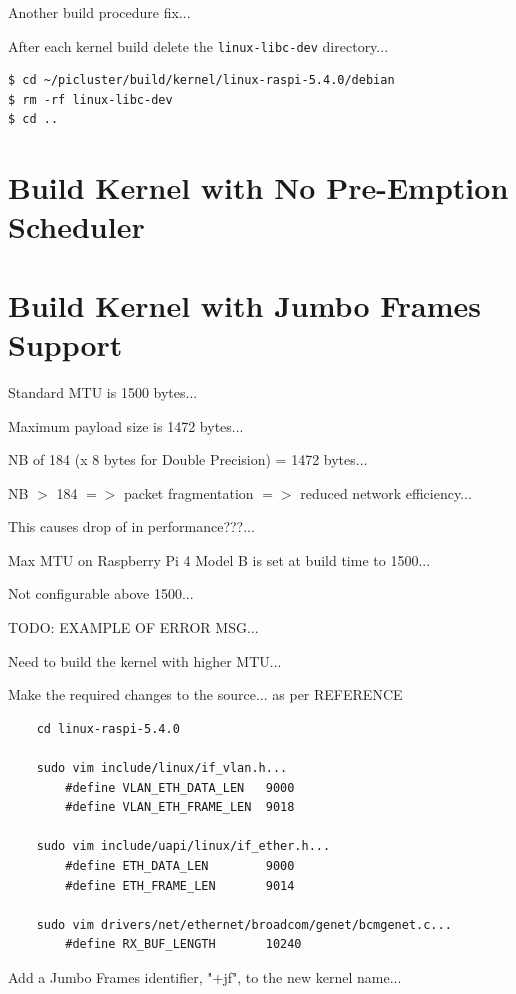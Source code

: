 \documentclass{report}
\begin{document}
Another build procedure fix...

After each kernel build delete the \verb|linux-libc-dev| directory...

\lstset{style=type}
\begin{lstlisting}
$ cd ~/picluster/build/kernel/linux-raspi-5.4.0/debian
$ rm -rf linux-libc-dev
$ cd ..
\end{lstlisting}


%
%
\chapter{Build Kernel with No Pre-Emption Scheduler}


%
%
\chapter{Build Kernel with Jumbo Frames Support}

Standard MTU is 1500 bytes...

Maximum payload size is 1472 bytes...

NB of 184 (x 8 bytes for Double Precision) = 1472 bytes...

NB $>$ 184 $=>$ packet fragmentation $=>$ reduced network efficiency...

This causes drop of in performance???...

Max MTU on Raspberry Pi 4 Model B is set at build time to 1500...

Not configurable above 1500...

TODO: EXAMPLE OF ERROR MSG...

Need to build the kernel with higher MTU...


Make the required changes to the source... as per REFERENCE

\begin{verbatim}
    cd linux-raspi-5.4.0 

    sudo vim include/linux/if_vlan.h...
        #define VLAN_ETH_DATA_LEN   9000
        #define VLAN_ETH_FRAME_LEN  9018
    
    sudo vim include/uapi/linux/if_ether.h...
        #define ETH_DATA_LEN        9000
        #define ETH_FRAME_LEN       9014
    
    sudo vim drivers/net/ethernet/broadcom/genet/bcmgenet.c...
        #define RX_BUF_LENGTH       10240
\end{verbatim}

Add a Jumbo Frames identifier, "+jf", to the new kernel name...
\end{document}
